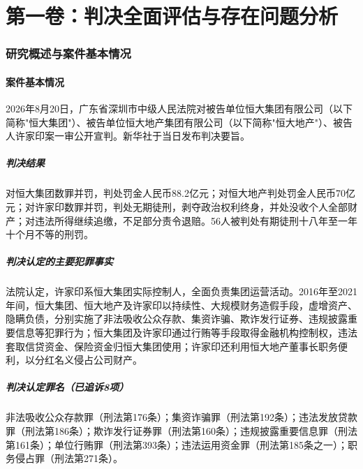 \documentclass[11pt,a4paper,oneside,openany]{article}
\begin{document}
\fontsize{11pt}{14.5pt}\selectfont
{}

\part{第一卷：判决全面评估与存在问题分析}

\section{研究概述与案件基本情况}

\subsection{案件基本情况}
2026年8月20日，广东省深圳市中级人民法院对被告单位恒大集团有限公司（以下简称"恒大集团"）、被告单位恒大地产集团有限公司（以下简称"恒大地产"）、被告人许家印案一审公开宣判。新华社于当日发布判决要旨。

\subsubsection{判决结果}
对恒大集团数罪并罚，判处罚金人民币88.2亿元；对恒大地产判处罚金人民币70亿元；对许家印数罪并罚，判处无期徒刑，剥夺政治权利终身，并处没收个人全部财产；对违法所得继续追缴，不足部分责令退赔。56人被判处有期徒刑十八年至一年十个月不等的刑罚。

\subsubsection{判决认定的主要犯罪事实}
法院认定，许家印系恒大集团实际控制人，全面负责集团运营活动。2016年至2021年间，恒大集团、恒大地产及许家印以持续性、大规模财务造假手段，虚增资产、隐瞒负债，分别实施了非法吸收公众存款、集资诈骗、欺诈发行证券、违规披露重要信息等犯罪行为；恒大集团及许家印通过行贿等手段取得金融机构控制权，违法套取信贷资金、保险资金归恒大集团使用；许家印还利用恒大地产董事长职务便利，以分红名义侵占公司财产。

\subsubsection{判决认定罪名（已追诉8项）}
非法吸收公众存款罪（刑法第176条）；集资诈骗罪（刑法第192条）；违法发放贷款罪（刑法第186条）；欺诈发行证券罪（刑法第160条）；违规披露重要信息罪（刑法第161条）；单位行贿罪（刑法第393条）；违法运用资金罪（刑法第185条之一）；职务侵占罪（刑法第271条）。
\end{document}
